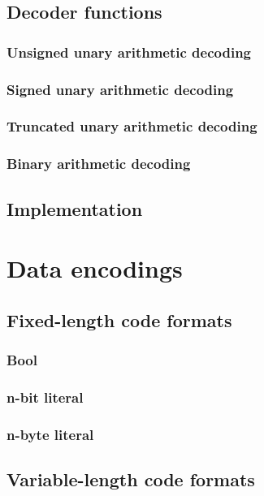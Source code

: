 \subsection{Decoder functions}
\subsubsection{Unsigned unary arithmetic decoding}
\subsubsection{Signed unary arithmetic decoding}
\subsubsection{Truncated unary arithmetic decoding}
\subsubsection{Binary arithmetic decoding}
\subsection{Implementation}

\clearpage
\section{Data encodings}
\subsection{Fixed-length code formats}
\subsubsection{Bool}
\subsubsection{n-bit literal}
\subsubsection{n-byte literal}
\subsection{Variable-length code formats}
